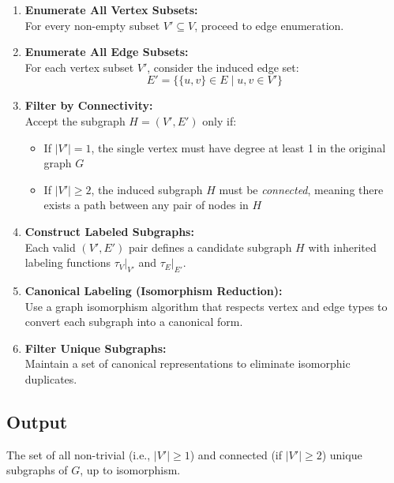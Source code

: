 \documentclass{article}
\begin{document}
\begin{enumerate}
    \item \textbf{Enumerate All Vertex Subsets:} \\
    For every non-empty subset \( V' \subseteq V \), proceed to edge enumeration.

    \item \textbf{Enumerate All Edge Subsets:} \\
    For each vertex subset \( V' \), consider the induced edge set:
    \[
    E' = \{ \{u, v\} \in E \mid u, v \in V' \}
    \]

    \item \textbf{Filter by Connectivity:} \\
    Accept the subgraph \( H = (V', E') \) only if:
    \begin{itemize}
        \item If \( |V'| = 1 \), the single vertex must have degree at least 1 in the original graph \( G \)
        \item If \( |V'| \geq 2 \), the induced subgraph \( H \) must be \emph{connected}, meaning there exists a path between any pair of nodes in \( H \)
    \end{itemize}

    \item \textbf{Construct Labeled Subgraphs:} \\
    Each valid \( (V', E') \) pair defines a candidate subgraph \( H \) with inherited labeling functions \( \tau_V|_{V'} \) and \( \tau_E|_{E'} \).

    \item \textbf{Canonical Labeling (Isomorphism Reduction):} \\
    Use a graph isomorphism algorithm that respects vertex and edge types to convert each subgraph into a canonical form.

    \item \textbf{Filter Unique Subgraphs:} \\
    Maintain a set of canonical representations to eliminate isomorphic duplicates.
\end{enumerate}

\subsection*{Output}

The set of all non-trivial (i.e., \( |V'| \geq 1 \)) and connected (if \( |V'| \geq 2 \)) unique subgraphs of \( G \), up to isomorphism.
\end{document}
